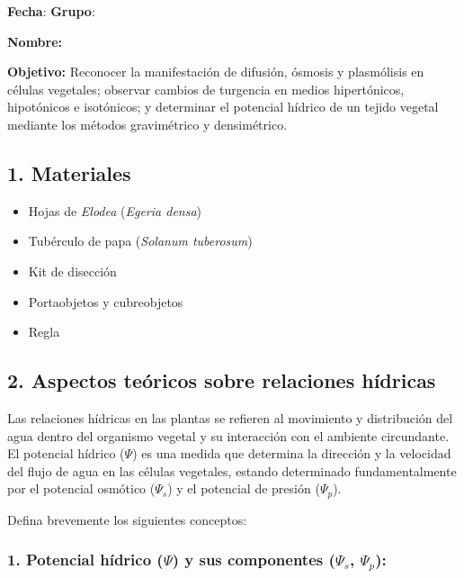\documentclass[
  spanish,
  10pt,
  letterpaper,
  twocolumn]{article}
\title{\vspace{-1.5em}{\Huge \textbf{Práctica No.~2 -- Relaciones
Hídricas}}\vspace{-1.5em}}
\date{}
\providecommand{\tightlist}{%
  \setlength{\itemsep}{0pt}\setlength{\parskip}{0pt}}
\begin{document}
\maketitle


\textbf{Fecha}: \hrulefill \hfill \textbf{Grupo}: \hrulefill

\textbf{Nombre:} \hrulefill

\textbf{Objetivo:} Reconocer la manifestación de difusión, ósmosis y
plasmólisis en células vegetales; observar cambios de turgencia en
medios hipertónicos, hipotónicos e isotónicos; y determinar el potencial
hídrico de un tejido vegetal mediante los métodos gravimétrico y
densimétrico.

\subsection{1. Materiales}\label{materiales}

\begin{itemize}
\tightlist
\item
  Hojas de \emph{Elodea} (\emph{Egeria densa})
\item
  Tubérculo de papa (\emph{Solanum tuberosum})
\item
  Kit de disección
\item
  Portaobjetos y cubreobjetos
\item
  Regla
\end{itemize}

\subsection{2. Aspectos teóricos sobre relaciones
hídricas}\label{aspectos-teuxf3ricos-sobre-relaciones-huxeddricas}

Las relaciones hídricas en las plantas se refieren al movimiento y
distribución del agua dentro del organismo vegetal y su interacción con
el ambiente circundante. El potencial hídrico (\(\Psi\)) es una medida
que determina la dirección y la velocidad del flujo de agua en las
células vegetales, estando determinado fundamentalmente por el potencial
osmótico (\(\Psi_s\)) y el potencial de presión (\(\Psi_p\)).

Defina brevemente los siguientes conceptos:

\subsubsection{\texorpdfstring{1. Potencial hídrico (\(\Psi\)) y sus
componentes (\(\Psi_s\),
\(\Psi_p\)):}{1. Potencial hídrico (\textbackslash Psi) y sus componentes (\textbackslash Psi\_s, \textbackslash Psi\_p):}}\label{potencial-huxeddrico-psi-y-sus-componentes-psi_s-psi_p}
\end{document}
